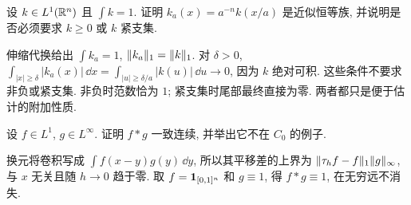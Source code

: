 \begin{exercise}
设 $k\in L^1(\mathbb R^n)$ 且 $\int k=1$. 证明 $k_a(x)=a^{-n}k(x/a)$ 是近似恒等族, 并说明是否必须要求 $k\ge0$ 或 $k$ 紧支集.
\end{exercise}
\begin{solution}
伸缩代换给出 $\int k_a=1$, $\lVert k_a\rVert_1=\lVert k\rVert_1$. 对 $\delta>0$,
$\int_{|x|\ge\delta}|k_a(x)|\,\dd x=\int_{|u|\ge\delta/a}|k(u)|\,\dd u\to0$,
因为 $k$ 绝对可积. 这些条件不要求非负或紧支集. 非负时范数恰为 $1$; 紧支集时尾部最终直接为零. 两者都只是便于估计的附加性质.
\end{solution}

\begin{exercise}
设 $f\in L^1$, $g\in L^\infty$. 证明 $f*g$ 一致连续, 并举出它不在 $C_0$ 的例子.
\end{exercise}
\begin{solution}
换元将卷积写成 $\int f(x-y)g(y)\,\dd y$, 所以其平移差的上界为 $\lVert \tau_hf-f\rVert_1\lVert g\rVert_\infty$, 与 $x$ 无关且随 $h\to0$ 趋于零. 取 $f=\mathbf 1_{[0,1]^n}$ 和 $g\equiv1$, 得 $f*g\equiv1$, 在无穷远不消失.
\end{solution}
